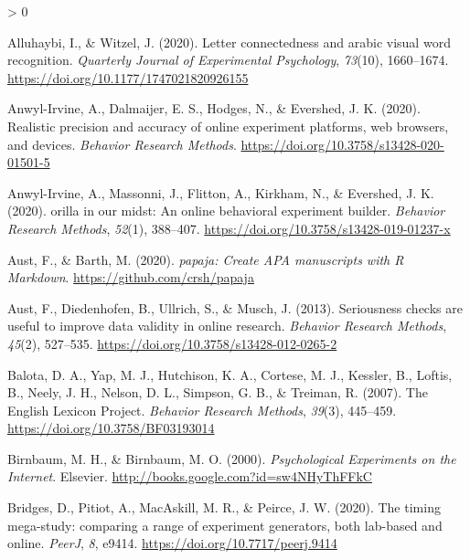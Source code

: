 \documentclass[
  english,
  man,floatsintext]{apa6}
\newlength{\cslhangindent}
\newenvironment{CSLReferences}[2] %
 {%
  \setlength{\parindent}{0pt}
  \ifodd #1 \everypar{\setlength{\hangindent}{\cslhangindent}}\ignorespaces\fi
  \ifnum #2 > 0
  \setlength{\parskip}{#2\baselineskip}
  \fi
 }%
 {}
\begin{document}
\begingroup
\setlength{\parindent}{-0.5in}
\setlength{\leftskip}{0.5in}

\hypertarget{refs}{}
\begin{CSLReferences}{1}{0}
\leavevmode\hypertarget{ref-Alluhaybi_2020}{}%
Alluhaybi, I., \& Witzel, J. (2020). Letter connectedness and arabic visual word recognition. \emph{Quarterly Journal of Experimental Psychology}, \emph{73}(10), 1660--1674. \url{https://doi.org/10.1177/1747021820926155}

\leavevmode\hypertarget{ref-anwyl-irvine2020a}{}%
Anwyl-Irvine, A., Dalmaijer, E. S., Hodges, N., \& Evershed, J. K. (2020). Realistic precision and accuracy of online experiment platforms, web browsers, and devices. \emph{Behavior Research Methods}. \url{https://doi.org/10.3758/s13428-020-01501-5}

\leavevmode\hypertarget{ref-anwyl-irvine2020}{}%
Anwyl-Irvine, A., Massonni, J., Flitton, A., Kirkham, N., \& Evershed, J. K. (2020). orilla in our midst: An online behavioral experiment builder. \emph{Behavior Research Methods}, \emph{52}(1), 388--407. \url{https://doi.org/10.3758/s13428-019-01237-x}

\leavevmode\hypertarget{ref-R-papaja}{}%
Aust, F., \& Barth, M. (2020). \emph{{papaja}: {Create} {APA} manuscripts with {R Markdown}}. \url{https://github.com/crsh/papaja}

\leavevmode\hypertarget{ref-austSeriousnessChecksAre2013}{}%
Aust, F., Diedenhofen, B., Ullrich, S., \& Musch, J. (2013). Seriousness checks are useful to improve data validity in online research. \emph{Behavior Research Methods}, \emph{45}(2), 527--535. \url{https://doi.org/10.3758/s13428-012-0265-2}

\leavevmode\hypertarget{ref-balota2007}{}%
Balota, D. A., Yap, M. J., Hutchison, K. A., Cortese, M. J., Kessler, B., Loftis, B., Neely, J. H., Nelson, D. L., Simpson, G. B., \& Treiman, R. (2007). The English Lexicon Project. \emph{Behavior Research Methods}, \emph{39}(3), 445--459. \url{https://doi.org/10.3758/BF03193014}

\leavevmode\hypertarget{ref-birnbaumPsychologicalExperimentsInternet2000a}{}%
Birnbaum, M. H., \& Birnbaum, M. O. (2000). \emph{Psychological {Experiments} on the {Internet}}. {Elsevier}. \url{http://books.google.com?id=sw4NHyThFFkC}

\leavevmode\hypertarget{ref-bridges2020}{}%
Bridges, D., Pitiot, A., MacAskill, M. R., \& Peirce, J. W. (2020). The timing mega-study: comparing a range of experiment generators, both lab-based and online. \emph{PeerJ}, \emph{8}, e9414. \url{https://doi.org/10.7717/peerj.9414}


\end{CSLReferences}
\end{document}
